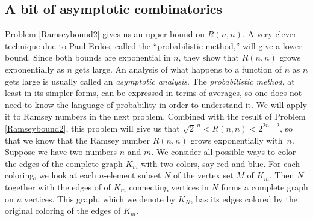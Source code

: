 \subsection{A bit of asymptotic combinatorics}
Problem \ref{Ramseybound2} gives us an upper bound on $R(n,n)$.  A very
clever technique due to Paul Erd\"os, called the ``probabilistic method,''
will give a lower bound.  Since both bounds are exponential in $n$, they
show that $R(n,n)$ grows exponentially as $n$ gets large.  An analysis of
what happens to a function of $n$ as $n$ gets large is usually called an
{\em asymptotic analysis}.  The {\em
probabilistic method},
at least in its simpler forms, can be expressed in terms of averages, so one
does not need to know the language of probability in order to understand it. 
We will apply it to Ramsey numbers in the next problem.  Combined with the
result of Problem
\ref{Ramseybound2}, this problem will give us that
$\sqrt{2}^{\>n}<R(n,n)<2^{2n-2}$, so that we know that the Ramsey number
$R(n,n)$ grows exponentially with~$n$.
\bp 
\itemi Suppose we have two numbers $n$ and $m$.  We consider
all possible ways to color the edges of the complete graph $K_m$
with two colors, say red and blue.  For each coloring, we look at each
$n$-element subset
$N$  of the vertex set $M$ of $K_m$.  Then $N$ together with the edges of
of $K_m$ connecting vertices in $N$ forms a complete graph on $n$
vertices.  This graph, which we denote by $K_N$, has its edges colored by
the original coloring of the edges of $K_m$. 
